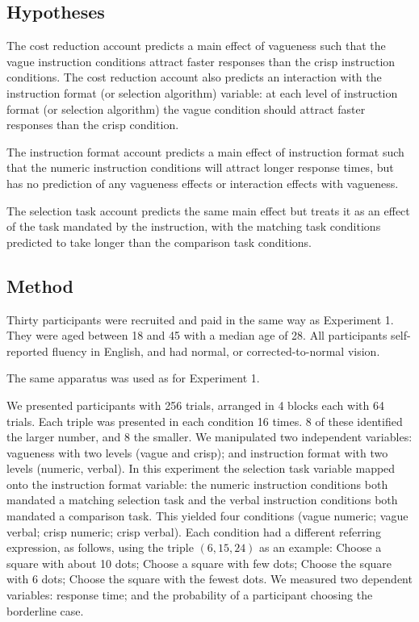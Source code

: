 \documentclass[graybox,envcountchap,sectrefs%
,footinfo
]{svmono}
\begin{document}
\subsection{Hypotheses}
The cost reduction account predicts a main effect of vagueness such that the vague instruction conditions attract faster responses than the crisp instruction conditions. The cost reduction account also predicts an interaction with the instruction format (or selection algorithm) variable: at each level of instruction format (or selection algorithm) the vague condition should attract faster responses than the crisp condition.%

The instruction format account predicts a main effect of instruction format such that the numeric instruction conditions will attract longer response times, but has no prediction of any vagueness effects or interaction effects with vagueness.  

The selection task account predicts the same main effect but treats it as an effect of the task mandated by the instruction, with the matching task conditions predicted to take longer than the comparison task conditions.  


\subsection{Method}

Thirty participants were recruited and paid in the same way as Experiment 1. They were aged between 18 and 45 with a median age of 28. All participants self-reported fluency in English, and had normal, or corrected-to-normal vision.

The same apparatus was used as for Experiment 1.

We presented participants with 256 trials, arranged in 4 blocks each with 64 trials. Each triple was presented in each condition 16 times. 8 of these identified the larger number, and 8 the smaller. We manipulated two independent variables: vagueness with two levels (vague and crisp); and instruction format with two levels (numeric, verbal). In this experiment the selection task variable mapped onto the instruction format variable: the numeric instruction conditions both mandated a matching selection task and the verbal instruction conditions both mandated a comparison task. This yielded four conditions (vague numeric; vague verbal; crisp numeric; crisp verbal). Each condition had a different referring expression, as follows, using the triple $(6,15,24)$ as an example: Choose a square with about 10 dots; Choose a square with few dots; Choose the square with 6 dots; Choose the square with the fewest dots. We measured two dependent variables: response time; and the probability of a participant choosing the borderline case.
\end{document}
